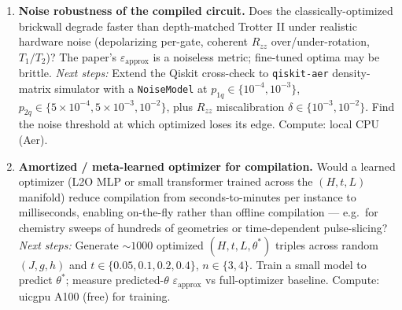 \begin{enumerate}
\item \textbf{Noise robustness of the compiled circuit.} Does the classically-optimized brickwall
degrade faster than depth-matched Trotter II under realistic hardware noise (depolarizing per-gate,
coherent $R_{zz}$ over/under-rotation, $T_1/T_2$)? The paper's $\varepsilon_{\text{approx}}$ is a
noiseless metric; fine-tuned optima may be brittle.
\emph{Next steps:} Extend the Qiskit cross-check to \texttt{qiskit-aer} density-matrix simulator with
a \texttt{NoiseModel} at $p_{1q} \in \{10^{-4}, 10^{-3}\}$, $p_{2q} \in \{5{\times}10^{-4}, 5{\times}10^{-3}, 10^{-2}\}$,
plus $R_{zz}$ miscalibration $\delta \in \{10^{-3}, 10^{-2}\}$. Find the noise threshold at which
optimized loses its edge. Compute: local CPU (Aer).

\item \textbf{Amortized / meta-learned optimizer for compilation.} Would a learned optimizer (L2O
MLP or small transformer trained across the $(H, t, L)$ manifold) reduce compilation from
seconds-to-minutes per instance to milliseconds, enabling on-the-fly rather than offline compilation
--- e.g.\ for chemistry sweeps of hundreds of geometries or time-dependent pulse-slicing?
\emph{Next steps:} Generate $\sim 1000$ optimized $(H, t, L, \theta^*)$ triples across random
$(J,g,h)$ and $t \in \{0.05, 0.1, 0.2, 0.4\}$, $n \in \{3, 4\}$. Train a small model to predict
$\theta^*$; measure predicted-$\theta$ $\varepsilon_{\text{approx}}$ vs full-optimizer baseline.
Compute: uicgpu A100 (free) for training.

\end{enumerate}
